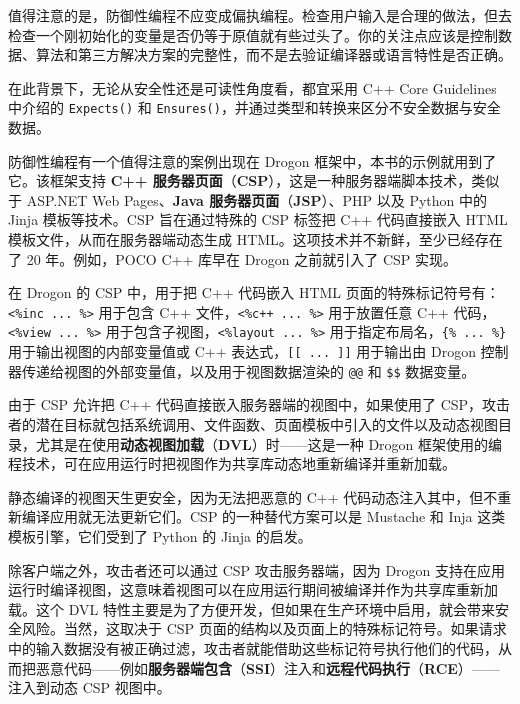 值得注意的是，防御性编程不应变成偏执编程。检查用户输入是合理的做法，但去检查一个刚初始化的变量是否仍等于原值就有些过头了。你的关注点应该是控制数据、算法和第三方解决方案的完整性，而不是去验证编译器或语言特性是否正确。

在此背景下，无论从安全性还是可读性角度看，都宜采用 C++ Core Guidelines 中介绍的 \texttt{Expects()} 和 \texttt{Ensures()}，并通过类型和转换来区分不安全数据与安全数据。

\label{idx:1032}
\label{idx:1033}
防御性编程有一个值得注意的案例出现在 Drogon 框架中，本书的示例就用到了它。该框架支持 \textbf{C++ 服务器页面}（\textbf{CSP}），这是一种服务器端脚本技术，类似于 ASP.NET Web Pages、\textbf{Java 服务器页面}（\textbf{JSP}）、PHP 以及 Python 中的 Jinja 模板等技术。CSP 旨在通过特殊的 CSP 标签把 C++ 代码直接嵌入 HTML 模板文件，从而在服务器端动态生成 HTML。这项技术并不新鲜，至少已经存在了 20 年。例如，POCO C++ 库早在 Drogon 之前就引入了 CSP 实现。

\label{idx:1034}
在 Drogon 的 CSP 中，用于把 C++ 代码嵌入 HTML 页面的特殊标记符号有：\texttt{<\%inc .\allowbreak{}.\allowbreak{}.\allowbreak{} \%>} 用于包含 C++ 文件，\texttt{<\%c+\allowbreak{}+\allowbreak{} .\allowbreak{}.\allowbreak{}.\allowbreak{} \%>} 用于放置任意 C++ 代码，\texttt{<\%view .\allowbreak{}.\allowbreak{}.\allowbreak{} \%>} 用于包含子视图，\texttt{<\%layout .\allowbreak{}.\allowbreak{}.\allowbreak{} \%>} 用于指定布局名，\texttt{\{\allowbreak{}\% .\allowbreak{}.\allowbreak{}.\allowbreak{} \%\}\allowbreak{}} 用于输出视图的内部变量值或 C++ 表达式，\texttt{[[ ... ]]} 用于输出由 Drogon 控制器传递给视图的外部变量值，以及用于视图数据渲染的 \texttt{@@} 和 \texttt{\$\$} 数据变量。

\label{idx:1035}
由于 CSP 允许把 C++ 代码直接嵌入服务器端的视图中，如果使用了 CSP，攻击者的潜在目标就包括系统调用、文件函数、页面模板中引入的文件以及动态视图目录，尤其是在使用\textbf{动态视图加载}（\textbf{DVL}）时——这是一种 Drogon 框架使用的编程技术，可在应用运行时把视图作为共享库动态地重新编译并重新加载。

静态编译的视图天生更安全，因为无法把恶意的 C++ 代码动态注入其中，但不重新编译应用就无法更新它们。CSP 的一种替代方案可以是 Mustache 和 Inja 这类模板引擎，它们受到了 Python 的 Jinja 的启发。

\label{idx:1036}
\label{idx:1037}
除客户端之外，攻击者还可以通过 CSP 攻击服务器端，因为 Drogon 支持在应用运行时编译视图，这意味着视图可以在应用运行期间被编译并作为共享库重新加载。这个 DVL 特性主要是为了方便开发，但如果在生产环境中启用，就会带来安全风险。当然，这取决于 CSP 页面的结构以及页面上的特殊标记符号。如果请求中的输入数据没有被正确过滤，攻击者就能借助这些标记符号执行他们的代码，从而把恶意代码——例如\textbf{服务器端包含}（\textbf{SSI}）注入和\textbf{远程代码执行}（\textbf{RCE}）——注入到动态 CSP 视图中。

